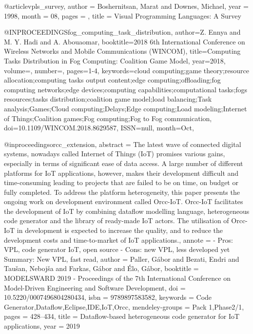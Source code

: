 @article{vpls_survey,
    author = {Boshernitsan, Marat and Downes, Michael},
    year = {1998},
    month = {08},
    pages = {},
    title = {Visual Programming Languages: A Survey}
}

@INPROCEEDINGS{fog_computing_task_distribution,
    author={Z. {Ennya} and M. Y. {Hadi} and A. {Abouaomar}},
    booktitle={2018 6th International Conference on Wireless Networks and Mobile Communications (WINCOM)},
    title={Computing Tasks Distribution in Fog Computing: Coalition Game Model},
    year={2018},
    volume={},
    number={},
    pages={1-4},
    keywords={cloud computing;game theory;resource allocation;computing tasks output content;edge computing;offloading;fog computing networks;edge devices;computing capabilities;computational tasks;fogs resources;tasks distribution;coalition game model;load balancing;Task analysis;Games;Cloud computing;Delays;Edge computing;Load modeling;Internet of Things;Coalition games;Fog computing;Fog to Fog communication},
    doi={10.1109/WINCOM.2018.8629587},
    ISSN={null},
    month={Oct},
}


@inproceedings{orcc_extension,
    abstract = {The latest wave of connected digital systems, nowadays called Internet of Things (IoT) promises various gains, especially in terms of significant ease of data access. A large number of different platforms for IoT applications, however, makes their development difficult and time-consuming leading to projects that are failed to be on time, on budget or fully completed. To address the platform heterogeneity, this paper presents the ongoing work on development environment called Orcc-IoT. Orcc-IoT facilitates the development of IoT by combining dataflow modelling language, heterogeneous code generator and the library of ready-made IoT actors. The utilisation of Orcc-IoT in development is expected to increase the quality, and to reduce the development costs and time-to-market of IoT applications.},
    annote = {- Pros: VPL, code generator IoT, open source
    - Cons: new VPL, less developed yet
    Summary: New VPL, fast read},
    author = {Paller, G{\'{a}}bor and Bezati, Endri and Tau{\v{s}}an, Neboj{\v{s}}a and Farkas, G{\'{a}}bor and {\'{E}}lo, G{\'{a}}bor},
    booktitle = {MODELSWARD 2019 - Proceedings of the 7th International Conference on Model-Driven Engineering and Software Development},
    doi = {10.5220/0007496804280434},
    isbn = {9789897583582},
    keywords = {Code Generator,Dataflow,Eclipse,IDE,IoT,Orcc},
    mendeley-groups = {Pack 1,Phase2/1},
    pages = {428--434},
    title = {{Dataflow-based heterogeneous code generator for IoT applications}},
    year = {2019}
}

